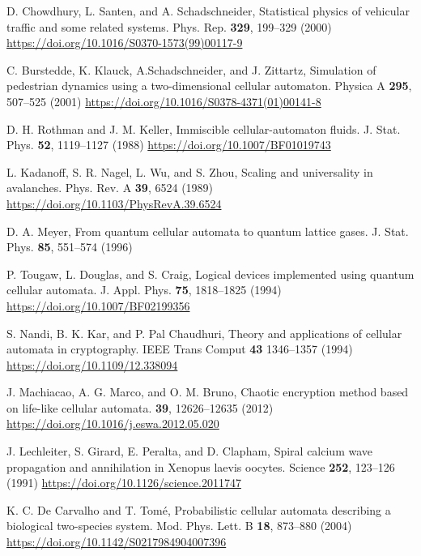 \begin{thebibliography}{04}


\raggedright
D. Chowdhury, L. Santen, and A. Schadschneider,
Statistical physics of vehicular traffic and some related systems.
Phys. Rep. \textbf{329}, 199--329 (2000)
\url{https://doi.org/10.1016/S0370-1573(99)00117-9}


\raggedright
C. Burstedde, K. Klauck, A.Schadschneider, and J. Zittartz,
Simulation of pedestrian dynamics using a two-dimensional cellular automaton. 
Physica A \textbf{295}, 507--525 (2001)
\url{https://doi.org/10.1016/S0378-4371(01)00141-8}

\raggedright
D. H. Rothman and J. M. Keller,
Immiscible cellular-automaton fluids.
J. Stat. Phys. \textbf{52}, 1119--1127 (1988) 
\url{https://doi.org/10.1007/BF01019743}

\raggedright
L. Kadanoff, S. R. Nagel, L. Wu, and S. Zhou,
Scaling and universality in avalanches.
Phys. Rev. A \textbf{39}, 6524 (1989)
\url{https://doi.org/10.1103/PhysRevA.39.6524}

\raggedright
D. A. Meyer,
From quantum cellular automata to quantum lattice gases.
J. Stat. Phys. \textbf{85}, 551--574 (1996)
\url{}

\raggedright
P. Tougaw, L. Douglas, and S. Craig,
Logical devices implemented using quantum cellular automata.
J. Appl. Phys. \textbf{75}, 1818--1825 (1994)
\url{https://doi.org/10.1007/BF02199356}

\raggedright
S. Nandi, B. K. Kar, and P. Pal Chaudhuri,
Theory and applications of cellular automata in cryptography.
IEEE Trans Comput \textbf{43} 1346--1357 (1994)
\url{https://doi.org/10.1109/12.338094}

\raggedright
J. Machiacao, A. G. Marco, and O. M. Bruno,
Chaotic encryption method based on life-like cellular automata.
\textbf{39}, 12626--12635 (2012)
\url{https://doi.org/10.1016/j.eswa.2012.05.020}

\raggedright
J. Lechleiter, S. Girard, E. Peralta, and D. Clapham,
Spiral calcium wave propagation and annihilation in Xenopus laevis oocytes.
Science \textbf{252}, 123--126 (1991)
\url{https://doi.org/10.1126/science.2011747}

\raggedright
K. C. De Carvalho and T. Tomé,
Probabilistic cellular automata describing a biological two-species system.
Mod. Phys. Lett. B \textbf{18}, 873--880 (2004)
\url{https://doi.org/10.1142/S0217984904007396}


\end{thebibliography}
